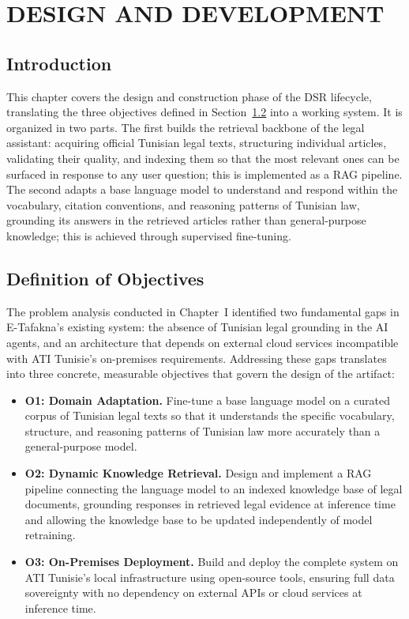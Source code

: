 \chapter{DESIGN AND DEVELOPMENT}

\section{Introduction}
\label{sec:ch3-introduction}

This chapter covers the design and construction phase of the \ac{DSR} lifecycle, translating the three objectives defined in Section~\ref{sec:ch3-objectives} into a working system. It is organized in two parts. The first builds the retrieval backbone of the legal assistant: acquiring official Tunisian legal texts, structuring individual articles, validating their quality, and indexing them so that the most relevant ones can be surfaced in response to any user question; this is implemented as a \ac{RAG} pipeline. The second adapts a base language model to understand and respond within the vocabulary, citation conventions, and reasoning patterns of Tunisian law, grounding its answers in the retrieved articles rather than general-purpose knowledge; this is achieved through supervised fine-tuning.

\section{Definition of Objectives}
\label{sec:ch3-objectives}

The problem analysis conducted in Chapter~I identified two fundamental gaps in E-Tafakna's existing system: the absence of Tunisian legal grounding in the \ac{AI} agents, and an architecture that depends on external cloud services incompatible with \ac{ATI} Tunisie's on-premises requirements. Addressing these gaps translates into three concrete, measurable objectives that govern the design of the artifact:

\begin{itemize}
    \item \textbf{O1: Domain Adaptation.} Fine-tune a base language model on a curated corpus of Tunisian legal texts so that it understands the specific vocabulary, structure, and reasoning patterns of Tunisian law more accurately than a general-purpose model.

    \item \textbf{O2: Dynamic Knowledge Retrieval.} Design and implement a \ac{RAG} pipeline connecting the language model to an indexed knowledge base of legal documents, grounding responses in retrieved legal evidence at inference time and allowing the knowledge base to be updated independently of model retraining.

    \item \textbf{O3: On-Premises Deployment.} Build and deploy the complete system on \ac{ATI} Tunisie's local infrastructure using open-source tools, ensuring full data sovereignty with no dependency on external \ac{API}s or cloud services at inference time.
\end{itemize}

